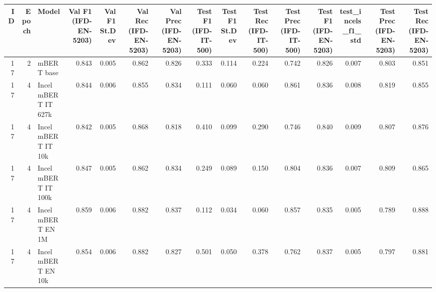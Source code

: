 \begin{tabular}{rrlrrrrrrrrrrrr}
\toprule
 ID &  Epoch &               Model &  Val F1 (IFD-EN-5203) &  Val F1 St.Dev &  Val Rec (IFD-EN-5203) &  Val Prec (IFD-EN-5203) &  Test F1 (IFD-IT-500) &  Test F1 St.Dev &  Test Rec (IFD-IT-500) &  Test Prec (IFD-IT-500) &  Test F1 (IFD-EN-5203) &  test\_incels\_f1\_std &  Test Prec (IFD-EN-5203) &  Test Rec (IFD-EN-5203) \\
\midrule
 17 &      2 &          mBERT base &                 0.843 &          0.005 &                  0.862 &                   0.826 &                 0.333 &           0.114 &                  0.224 &                   0.742 &                  0.826 &               0.007 &                    0.803 &                   0.851 \\
 17 &      4 & Incel mBERT IT 627k &                 0.844 &          0.006 &                  0.855 &                   0.834 &                 0.111 &           0.060 &                  0.060 &                   0.861 &                  0.836 &               0.008 &                    0.819 &                   0.855 \\
 17 &      4 &  Incel mBERT IT 10k &                 0.842 &          0.005 &                  0.868 &                   0.818 &                 0.410 &           0.099 &                  0.290 &                   0.746 &                  0.840 &               0.009 &                    0.807 &                   0.876 \\
 17 &      4 & Incel mBERT IT 100k &                 0.847 &          0.005 &                  0.862 &                   0.834 &                 0.249 &           0.089 &                  0.150 &                   0.804 &                  0.836 &               0.007 &                    0.809 &                   0.865 \\
 17 &      4 &   Incel mBERT EN 1M &                 0.859 &          0.006 &                  0.882 &                   0.837 &                 0.112 &           0.034 &                  0.060 &                   0.857 &                  0.835 &               0.005 &                    0.789 &                   0.888 \\
 17 &      4 &  Incel mBERT EN 10k &                 0.854 &          0.006 &                  0.882 &                   0.827 &                 0.501 &           0.050 &                  0.378 &                   0.762 &                  0.837 &               0.005 &                    0.797 &                   0.881 \\

\end{tabular}
